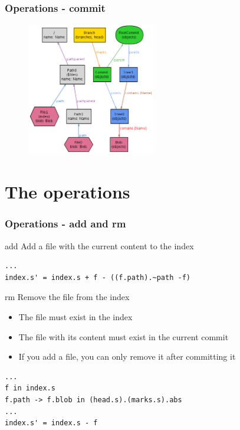 \documentclass{beamer}
\begin{document}
\begin{frame}[fragile]
   \frametitle{Operations - commit}
   \begin{figure}
      \centering
      \includegraphics[width=0.5\textwidth]{images/commit2.png}
   \end{figure}
\end{frame}


\section{The operations}
\begin{frame}[fragile]
   \frametitle{Operations - add and rm}
   \begin{block}{add}
      Add a file with the current content to the index
   \end{block}
   \tiny
   \begin{lstlisting}
...
index.s' = index.s + f - ((f.path).~path -f)
   \end{lstlisting}
   \normalsize
   \begin{block}{rm}
      Remove the file from the index
      \begin{itemize}
	\item The file must exist in the index
	\item The file with its content must exist in the current commit
	\item If you add a file, you can only remove it after committing it 
      \end{itemize}
   \end{block}
   \tiny
   \begin{lstlisting}
...
f in index.s
f.path -> f.blob in (head.s).(marks.s).abs
...
index.s' = index.s - f
   \end{lstlisting}
\end{frame}
\end{document}
